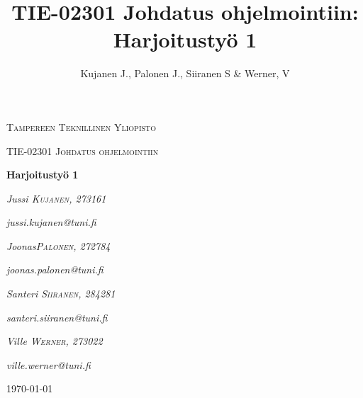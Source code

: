 \documentclass[12pt]{report} %
\title{TIE-02301 Johdatus ohjelmointiin: Harjoitustyö 1}
\author{Kujanen J., Palonen J., Siiranen S \& Werner, V}
\begin{document}

    \begin{titlepage}
        \centering
        {\scshape\LARGE Tampereen Teknillinen Yliopisto \par}
        \vspace{1cm}
        {\scshape\Large TIE-02301 Johdatus ohjelmointiin\par}
        \vspace{2.5cm}
        {\huge\bfseries Harjoitustyö 1 \par}
        \vspace{4cm}
        {\Large\itshape Jussi \textsc{Kujanen}, \textit{273161}\par}
	    {\quad \textit{jussi.kujanen@tuni.fi \newline} }
        {\Large\itshape Joonas\textsc{Palonen}, \textit{272784}\par}
	    { \quad \textit{joonas.palonen@tuni.fi \newline} }
        {\Large\itshape Santeri \textsc{Siiranen}, \textit{284281}\par}
	    { \quad \textit{santeri.siiranen@tuni.fi \newline} }
        {\Large\itshape Ville \textsc{Werner}, \textit{273022}\par}
	    { \quad \quad \textit{ville.werner@tuni.fi \newline} }
        
        \vfill
    
        \vfill
    
        {\large \today \par}
    \end{titlepage}

    
    \setcounter{page}{1}                    %
    


    {
        \hypersetup{linkcolor=black}
        \tableofcontents  %
    
    }
    
\end{document}
